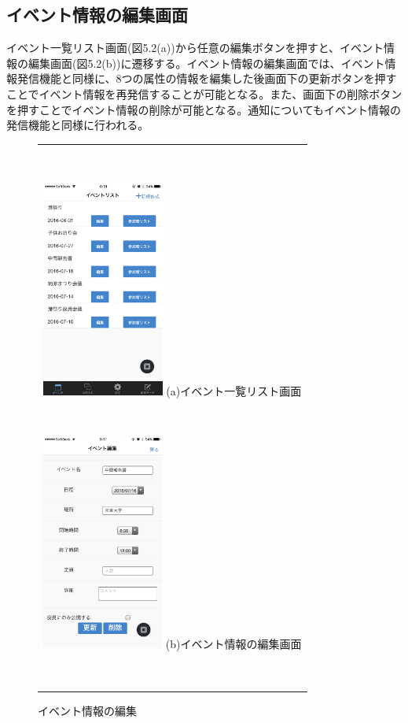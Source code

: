 \subsection{イベント情報の編集画面}%
イベント一覧リスト画面(図5.2(a))から任意の編集ボタンを押すと、イベント情報の編集画面(図5.2(b))に遷移する。イベント情報の編集画面では、イベント情報発信機能と同様に、8つの属性の情報を編集した後画面下の更新ボタンを押すことでイベント情報を再発信することが可能となる。また、画面下の削除ボタンを押すことでイベント情報の削除が可能となる。通知についてもイベント情報の発信機能と同様に行われる。
​
\begin{figure}[htbp]
  \begin{center}
    \begin{tabular}{c}
​
      \begin{minipage}{0.33\hsize}
        \begin{center}
\includegraphics[width=4cm]{event_list.PNG}
          \hspace{1cm} %
          {\footnotesize (a)イベント一覧リスト画面}
        \end{center}
      \end{minipage}
​
      \begin{minipage}{0.33\hsize}
        \begin{center}
\includegraphics[width=4cm]{event_edit.PNG}
          \hspace{1cm}%
          {\footnotesize (b)イベント情報の編集画面}
        \end{center}
      \end{minipage}
​
    \end{tabular}
    \caption{イベント情報の編集}
    \label{fig:lena}
  \end{center}
\end{figure}
​
